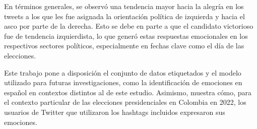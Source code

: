En términos generales, se observó una tendencia mayor hacia la alegría en los tweets a los que les fue asignada la orientación política de izquierda y hacia el asco por parte de la derecha. Esto se debe en parte a que el candidato victorioso fue de tendencia izquierdista, lo que generó estas respuestas emocionales en los respectivos sectores políticos, especialmente en fechas clave como el día de las elecciones.

Este trabajo pone a disposición el conjunto de datos etiquetados y el modelo utilizado para futuras investigaciones, como la identificación de emociones en español en contextos distintos al de este estudio. Asimismo, muestra cómo, para el contexto particular de las elecciones presidenciales en Colombia en 2022, los usuarios de Twitter que utilizaron los hashtags incluidos expresaron sus emociones.
